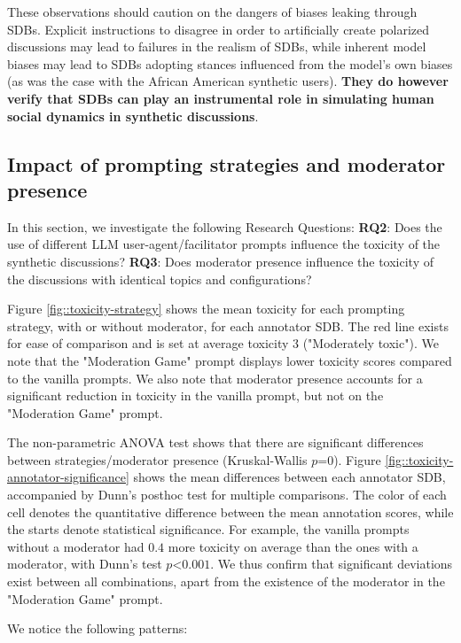 These observations should caution on the dangers of biases leaking through \acp{SDB}. Explicit instructions to disagree in order to artificially create polarized discussions may lead to failures in the realism of \acp{SDB}, while inherent model biases may lead to \acp{SDB} adopting stances influenced from the model's own biases (as was the case with the African American synthetic users). \textbf{They do however verify that \acp{SDB} can play an instrumental role in simulating human social dynamics in synthetic discussions}.


\subsection{Impact of prompting strategies and moderator presence}
\label{ssec:evaluation:prompts}

In this section, we investigate the following Research Questions: \textbf{RQ2}: Does the use of different LLM user-agent/facilitator prompts influence the toxicity of the synthetic discussions? \textbf{RQ3}: Does moderator presence influence the toxicity of the discussions with identical topics and configurations?

Figure \ref{fig::toxicity-strategy} shows the mean toxicity for each prompting strategy, with or without moderator, for each annotator \ac{SDB}. The red line exists for ease of comparison and is set at average toxicity 3 ("Moderately toxic"). We note that the "Moderation Game" prompt displays lower toxicity scores compared to the vanilla prompts. We also note that moderator presence accounts for a significant reduction in toxicity in the vanilla prompt, but not on the "Moderation Game" prompt. 

The non-parametric ANOVA test shows that there are significant differences between strategies/moderator presence (Kruskal-Wallis $p\text{=}0$). Figure \ref{fig::toxicity-annotator-significance} shows the mean differences between each annotator \ac{SDB}, accompanied by Dunn's posthoc test for multiple comparisons. The color of each cell denotes the quantitative difference between the mean annotation scores, while the starts denote statistical significance. For example, the vanilla prompts without a moderator had $0.4$ more toxicity on average than the ones with a moderator, with Dunn's test $p\text{<}0.001$. We thus confirm that significant deviations exist between all combinations, apart from the existence of the moderator in the "Moderation Game" prompt.

We notice the following patterns:

